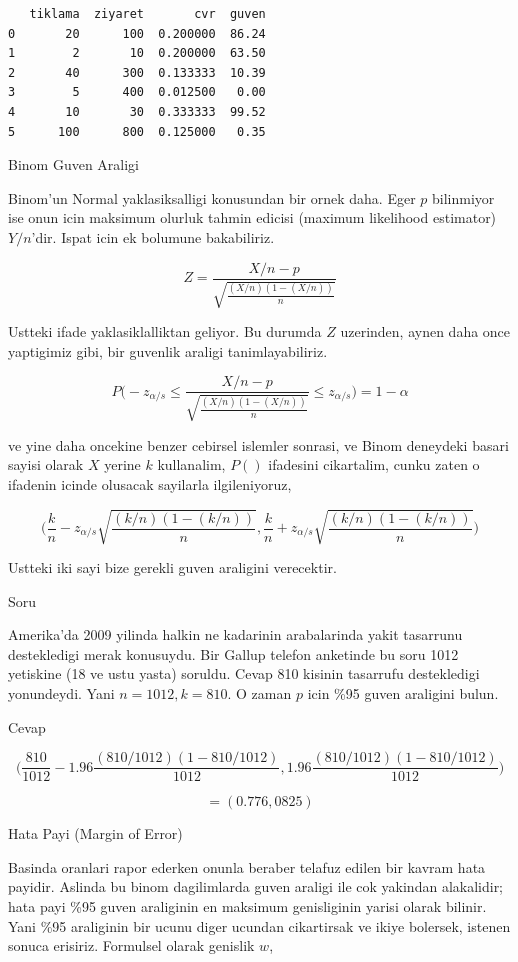\documentclass[12pt,fleqn]{article}\usepackage{../common}
\begin{document}
\begin{verbatim}
   tiklama  ziyaret       cvr  guven
0       20      100  0.200000  86.24
1        2       10  0.200000  63.50
2       40      300  0.133333  10.39
3        5      400  0.012500   0.00
4       10       30  0.333333  99.52
5      100      800  0.125000   0.35
\end{verbatim}

Binom Guven Araligi

Binom'un Normal yaklasiksalligi konusundan bir ornek daha. Eger $p$
bilinmiyor ise onun icin maksimum olurluk tahmin edicisi (maximum
likelihood estimator) $Y/n$'dir. Ispat icin ek bolumune bakabiliriz.

$$Z  = \frac{X/n - p}{\sqrt{\frac{(X/n)(1-(X/n))}{n}}}$$

Ustteki ifade yaklasiklalliktan geliyor. Bu durumda $Z$ uzerinden, aynen
daha once yaptigimiz gibi, bir guvenlik araligi tanimlayabiliriz. 

$$ 
P \bigg( 
-z_{\alpha/s} \le
\frac{X/n - p}{\sqrt{\frac{(X/n)(1-(X/n))}{n}}} \le 
z_{\alpha/s}
\bigg) =
1-\alpha
$$

ve yine daha oncekine benzer cebirsel islemler sonrasi, ve Binom deneydeki
basari sayisi olarak $X$ yerine $k$ kullanalim, $P()$ ifadesini cikartalim,
cunku zaten o ifadenin icinde olusacak sayilarla ilgileniyoruz,

$$ 
\bigg( 
\frac{k}{n}-
z_{\alpha/s}\sqrt{\frac{(k/n)(1-(k/n))}{n}}
,
\frac{k}{n} +
z_{\alpha/s} \sqrt{\frac{(k/n)(1-(k/n))}{n}}
\bigg)
$$

Ustteki iki sayi bize gerekli guven araligini verecektir. 

Soru 

Amerika'da 2009 yilinda halkin ne kadarinin arabalarinda yakit tasarrunu
destekledigi merak konusuydu. Bir Gallup telefon anketinde bu soru 1012
yetiskine (18 ve ustu yasta) soruldu. Cevap 810 kisinin tasarrufu
destekledigi yonundeydi. Yani $n=1012,k=810$. O zaman $p$ icin \%95 guven
araligini bulun.

Cevap 

$$ \bigg(
\frac{810}{1012}-1.96 \frac{(810/1012)(1-810/1012)}{1012} ,
1.96 \frac{(810/1012)(1-810/1012)}{1012}
\bigg)
$$

$$ = (0.776,0825) $$


Hata Payi (Margin of Error)

Basinda oranlari rapor ederken onunla beraber telafuz edilen bir kavram
hata payidir. Aslinda bu binom dagilimlarda guven araligi ile cok yakindan
alakalidir;  hata payi \%95 guven araliginin en maksimum genisliginin yarisi
olarak bilinir. Yani \%95 araliginin bir ucunu diger ucundan cikartirsak ve
ikiye bolersek, istenen sonuca erisiriz. Formulsel olarak genislik $w$,
\end{document}
